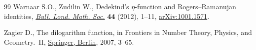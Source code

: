 \documentclass[10pt,a4paper]{amsart}
\numberwithin{equation}{section}
\theoremstyle{definition}
\begin{document}
\begin{thebibliography}{99}
Warnaar S.O., Zudilin W., Dedekind's {$\eta$}-function and
 {R}ogers--{R}amanujan identities,
 \href{https://doi.org/10.1112/blms/bdr019}{\textit{Bull. Lond. Math. Soc.}}
 \textbf{44} (2012), 1--11,
 \href{http://arxiv.org/abs/1001.1571}{arXiv:1001.1571}.

Zagier D., The dilogarithm function, in Frontiers in Number Theory, Physics, and Geometry.~{II},
 \href{https://doi.org/10.1007/978-3-540-30308-4_1}{Springer, Berlin}, 2007,
 3--65.

\end{thebibliography}
\end{document}
